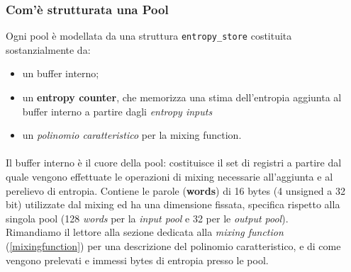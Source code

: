 \documentclass{article}
\begin{document}
 \subsubsection{Com'è strutturata una Pool}
 Ogni pool è modellata
 da una struttura \verb+entropy_store+ costituita sostanzialmente da:
 \begin{itemize}
   \item un buffer interno; 
   \item un \textbf{entropy counter}, che memorizza una stima dell'entropia
   aggiunta al buffer interno a partire dagli \emph{entropy inputs}
   \item un \emph{polinomio caratteristico} per la mixing function.
 \end{itemize}
 

 \paragraph{}Il buffer interno è il cuore della pool: costituisce il set di 
 registri a partire dal quale vengono effettuate le operazioni di mixing necessarie
 all'aggiunta e al perelievo di entropia. Contiene le parole (\textbf{words}) di
 16 bytes (4 unsigned a 32 bit) utilizzate dal mixing ed ha una dimensione fissata,
 specifica rispetto alla singola pool (128 \emph{words} per la \emph{input pool} e 32 per
 le \emph{output pool}). \\
 Rimandiamo il lettore alla sezione dedicata alla \emph{mixing function}
 (\ref{mixingfunction}) per una descrizione del polinomio caratteristico, e di
 come vengono prelevati e immessi bytes di entropia presso le pool.
 
\end{document}

